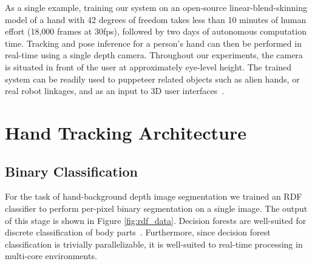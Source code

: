 As a single example, training our system on an open-source linear-blend-skinning model of a hand with 42 degrees of freedom takes less than 10 minutes of human effort (18,000 frames at 30fps), followed by two days of autonomous computation time. Tracking and pose inference for a person's hand can then be performed in real-time using a single depth camera. Throughout our experiments, the camera is situated in front of the user at approximately eye-level height. The trained system can be readily used to puppeteer related objects such as alien hands, or real robot linkages, and as an input to 3D user interfaces~\cite{Stein2012}.

\chapter{Hand Tracking Architecture\label{chap:1_hand_tracking_archiecture}}

\section{Binary Classification}
\label{sec:binary_classification}

For the task of hand-background depth image segmentation we trained an RDF classifier to perform per-pixel binary segmentation on a single image. The output of this stage is shown in Figure \ref{fig:rdf_data}. Decision forests are well-suited for discrete classification of body parts~\cite{shotton2013real}. Furthermore, since decision forest classification is trivially parallelizable, it is well-suited to real-time processing in multi-core environments.

